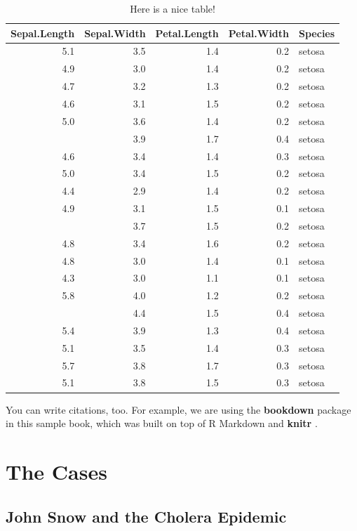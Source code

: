 \documentclass[
]{book}
\begin{document}
\begin{table}

\caption{\label{tab:nice-tab}Here is a nice table!}
\centering
\begin{tabular}[t]{rrrrl}
\toprule
Sepal.Length & Sepal.Width & Petal.Length & Petal.Width & Species\\
\midrule
5.1 & 3.5 & 1.4 & 0.2 & setosa\\
4.9 & 3.0 & 1.4 & 0.2 & setosa\\
4.7 & 3.2 & 1.3 & 0.2 & setosa\\
4.6 & 3.1 & 1.5 & 0.2 & setosa\\
5.0 & 3.6 & 1.4 & 0.2 & setosa\\
\addlinespace
5.4 & 3.9 & 1.7 & 0.4 & setosa\\
4.6 & 3.4 & 1.4 & 0.3 & setosa\\
5.0 & 3.4 & 1.5 & 0.2 & setosa\\
4.4 & 2.9 & 1.4 & 0.2 & setosa\\
4.9 & 3.1 & 1.5 & 0.1 & setosa\\
\addlinespace
5.4 & 3.7 & 1.5 & 0.2 & setosa\\
4.8 & 3.4 & 1.6 & 0.2 & setosa\\
4.8 & 3.0 & 1.4 & 0.1 & setosa\\
4.3 & 3.0 & 1.1 & 0.1 & setosa\\
5.8 & 4.0 & 1.2 & 0.2 & setosa\\
\addlinespace
5.7 & 4.4 & 1.5 & 0.4 & setosa\\
5.4 & 3.9 & 1.3 & 0.4 & setosa\\
5.1 & 3.5 & 1.4 & 0.3 & setosa\\
5.7 & 3.8 & 1.7 & 0.3 & setosa\\
5.1 & 3.8 & 1.5 & 0.3 & setosa\\
\bottomrule
\end{tabular}
\end{table}

You can write citations, too. For example, we are using the \textbf{bookdown} package \citep{R-bookdown} in this sample book, which was built on top of R Markdown and \textbf{knitr} \citep{xie2015}.

\hypertarget{the-cases}{%
\chapter{The Cases}\label{the-cases}}

\hypertarget{john-snow-and-the-cholera-epidemic}{%
\section{John Snow and the Cholera Epidemic}\label{john-snow-and-the-cholera-epidemic}}
\end{document}
